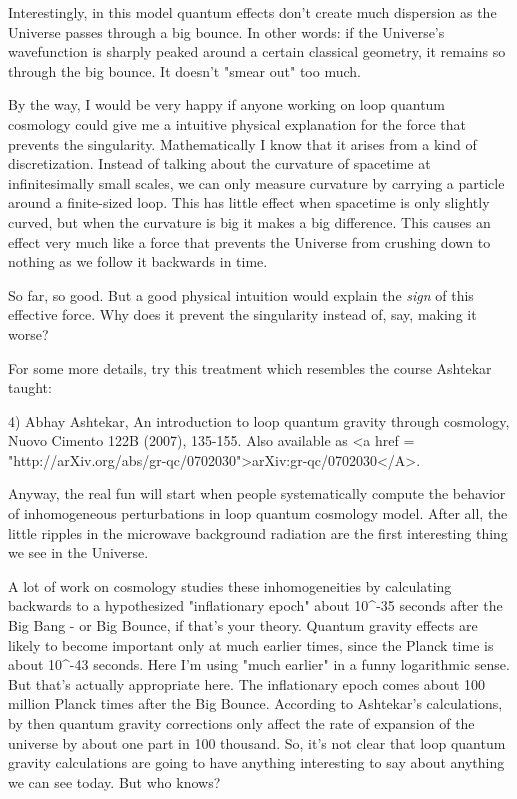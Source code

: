 Interestingly, in this model quantum effects don't create much
dispersion as the Universe passes through a big bounce.  In other
words: if the Universe's wavefunction is sharply peaked around a
certain classical geometry, it remains so through the big bounce.  It
doesn't "smear out" too much.

By the way, I would be very happy if anyone working on loop quantum
cosmology could give me a intuitive physical explanation for the force
that prevents the singularity.  Mathematically I know that it arises
from a kind of discretization.  Instead of talking about the curvature
of spacetime at infinitesimally small scales, we can only measure
curvature by carrying a particle around a finite-sized loop.  This has
little effect when spacetime is only slightly curved, but when the
curvature is big it makes a big difference.  This causes an effect
very much like a force that prevents the Universe from crushing down
to nothing as we follow it backwards in time.

So far, so good.  But a good physical intuition would explain the
\emph{sign} of this effective force.  Why does it prevent the
singularity instead of, say, making it worse?

For some more details, try this treatment which resembles the course
Ashtekar taught:

4) Abhay Ashtekar, An introduction to loop quantum gravity through
cosmology, Nuovo Cimento 122B (2007), 135-155.  Also available as
<a href = "http://arXiv.org/abs/gr-qc/0702030">arXiv:gr-qc/0702030</A>.

Anyway, the real fun will start when people systematically compute the
behavior of inhomogeneous perturbations in loop quantum cosmology
model.  After all, the little ripples in the microwave background
radiation are the first interesting thing we see in the Universe.

A lot of work on cosmology studies these inhomogeneities by
calculating backwards to a hypothesized "inflationary epoch"
about 10^{-35} seconds after the Big Bang - or Big Bounce, if
that's your theory.  Quantum gravity effects are likely to become
important only at much earlier times, since the Planck time is about
10^{-43} seconds.  Here I'm using "much earlier" in
a funny logarithmic sense.  But that's actually appropriate here.  The
inflationary epoch comes about 100 million Planck times after the Big
Bounce.  According to Ashtekar's calculations, by then quantum gravity
corrections only affect the rate of expansion of the universe by about
one part in 100 thousand.  So, it's not clear that loop quantum
gravity calculations are going to have anything interesting to say
about anything we can see today.  But who knows?

